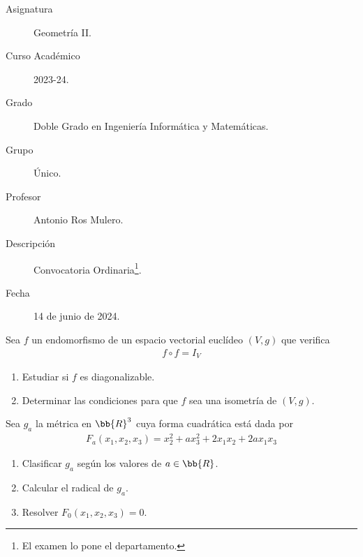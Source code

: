\documentclass[12pt]{article}
\begin{document}

    
    

    \begin{description}
        \item[Asignatura] Geometría II.
        \item[Curso Académico] 2023-24.
        \item[Grado] Doble Grado en Ingeniería Informática y Matemáticas.
        \item[Grupo] Único.
        \item[Profesor] Antonio Ros Mulero.
        \item[Descripción] Convocatoria Ordinaria\footnote{El examen lo pone el departamento.}.
        \item[Fecha] 14 de junio de 2024.
    \end{description}
    \newpage

    \begin{ejercicio}[3 puntos]
        Sea $f$ un endomorfismo de un espacio vectorial euclídeo $(V,g)$ que verifica
        \begin{gather*}
            f \circ f = I_V
        \end{gather*}

        \begin{enumerate}
            \item Estudiar si $f$ es diagonalizable.
            \item Determinar las condiciones para que $f$ sea una isometría de $(V,g)$.
        \end{enumerate}
    \end{ejercicio}

    \begin{ejercicio}[3.5 puntos]
        Sea $g_a$ la métrica en $\bb{R}^3$  cuya forma cuadrática está dada por
        \begin{gather*}
            F_a(x_1,x_2,x_3)=x_2^2 + ax_3^2 + 2x_1x_2 + 2ax_1x_3
        \end{gather*}
        \begin{enumerate}
            \item Clasificar $g_a$ según los valores de $a \in \bb{R}$.
            \item Calcular el radical de $g_a$.
            \item Resolver $F_0(x_1,x_2,x_3)=0$.
        \end{enumerate}
    \end{ejercicio}
\end{document}
